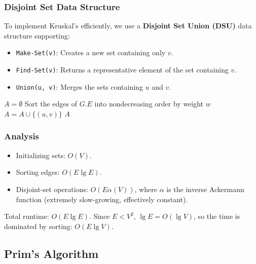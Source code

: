 \documentclass[12pt]{article}
\theoremstyle{blueplain}
\theoremstyle{bluedef}
\theoremstyle{blueremark}
\begin{document}
\subsubsection{Disjoint Set Data Structure}
To implement Kruskal's efficiently, we use a \textbf{Disjoint Set Union (DSU)} data structure supporting:
\begin{itemize}
    \item \texttt{Make-Set(v)}: Creates a new set containing only $v$.
    \item \texttt{Find-Set(v)}: Returns a representative element of the set containing $v$.
    \item \texttt{Union(u, v)}: Merges the sets containing $u$ and $v$.
\end{itemize}

\begin{algorithm}
    \caption{Kruskal's Algorithm}\label{alg:kruskal}
    \begin{algorithmic}[1]
        \State $A = \emptyset$
        \State {}
        \EndFor
        \State Sort the edges of $G.E$ into nondecreasing order by weight $w$
        \State $A = A \cup \{(u, v)\}$
        \State {}
        \EndIf
        \EndFor
        \State \Return $A$
        \EndProcedure
    \end{algorithmic}
\end{algorithm}

\subsubsection{Analysis}
\begin{itemize}
    \item Initializing sets: $O(V)$.
    \item Sorting edges: $O(E \lg E)$.
    \item Disjoint-set operations: $O(E \alpha(V))$, where $\alpha$ is the inverse Ackermann function (extremely slow-growing, effectively constant).
\end{itemize}
Total runtime: $O(E \lg E)$. Since $E < V^2$, $\lg E = O(\lg V)$, so the time is dominated by sorting: $O(E \lg V)$.

\subsection{Prim's Algorithm}
\end{document}
